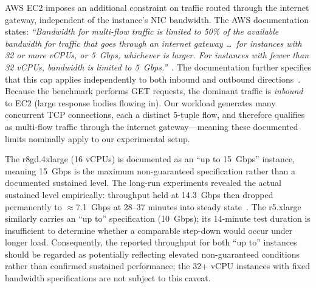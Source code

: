 AWS EC2 imposes an additional constraint on traffic routed through the internet gateway, independent of the instance's NIC bandwidth. The AWS documentation states: \textit{``Bandwidth for multi-flow traffic is limited to 50\% of the available bandwidth for traffic that goes through an internet gateway \ldots\ for instances with 32 or more vCPUs, or 5~Gbps, whichever is larger. For instances with fewer than 32 vCPUs, bandwidth is limited to 5~Gbps.''}~\cite{aws-ec2-network-bandwidth}. The documentation further specifies that this cap applies independently to both inbound and outbound directions~\cite{aws-ec2-network-bandwidth}. Because the benchmark performs GET requests, the dominant traffic is \emph{inbound} to EC2 (large response bodies flowing in). Our workload generates many concurrent TCP connections, each a distinct 5-tuple flow, and therefore qualifies as multi-flow traffic through the internet gateway---meaning these documented limits nominally apply to our experimental setup.

The r8gd.4xlarge (16 vCPUs) is documented as an ``up to 15~Gbps'' instance, meaning 15~Gbps is the maximum non-guaranteed specification rather than a documented sustained level. The long-run experiments revealed the actual sustained level empirically: throughput held at 14.3~Gbps then dropped permanently to $\approx$7.1~Gbps at 28--37 minutes into steady state~\cite{aws-ec2-network-bandwidth}. The r5.xlarge similarly carries an ``up to'' specification (10~Gbps); its 14-minute test duration is insufficient to determine whether a comparable step-down would occur under longer load. Consequently, the reported throughput for both ``up to'' instances should be regarded as potentially reflecting elevated non-guaranteed conditions rather than confirmed sustained performance; the 32+ vCPU instances with fixed bandwidth specifications are not subject to this caveat.

